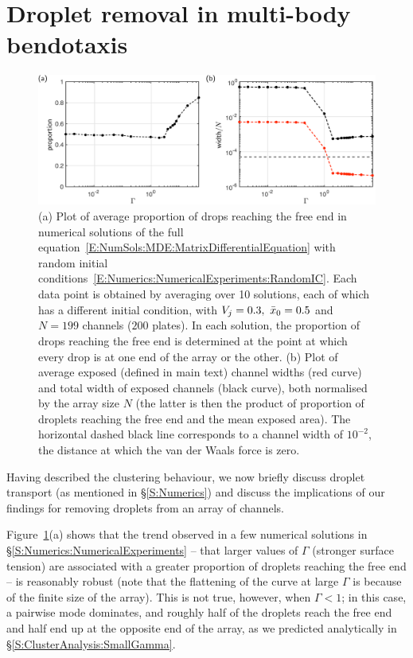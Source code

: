 \section{Droplet removal in multi-body bendotaxis}\label{S:Discussion}
\begin{figure}[t]
\centering
\includegraphics[scale=0.35]{proportion_and_exposed_area}
\caption{(a) Plot of average proportion of drops reaching the free end in numerical solutions of the full equation~\eqref{E:NumSols:MDE:MatrixDifferentialEquation} with random initial conditions~\eqref{E:Numerics:NumericalExperiments:RandomIC}. Each data point is obtained by averaging over 10 solutions, each of which has a different initial condition, with $V_j = 0.3,~ \bar{x}_0 = 0.5$ and $N = 199$ channels ($200$ plates). In each solution, the proportion of drops reaching the free end is determined at the point at which every drop is at one end of the array or the other. (b) Plot of average exposed (defined in main text) channel widths (red curve) and total width of exposed channels (black curve), both normalised by the array size $N$ (the latter is then the product of proportion of droplets reaching the free end and the mean exposed area). The horizontal dashed black line corresponds to a channel width of $10^{-2}$, the distance at which the van der Waals force is zero. }\label{fig:Discussion:Statistics}
\end{figure}

Having described the clustering behaviour, we now briefly discuss droplet transport (as mentioned in \S\ref{S:Numerics}) and discuss the implications of our findings for removing droplets from an array of channels.

Figure~\ref{fig:Discussion:Statistics}(a) shows that the trend observed in a few numerical solutions in \S\ref{S:Numerics:NumericalExperiments} -- that larger values of $\Gamma$ (stronger surface tension) are associated with a greater proportion of droplets reaching the free end -- is reasonably robust (note that the flattening of the curve at large $\Gamma$ is because of the finite size of the array). This is not true, however, when $\Gamma < 1$;  in this case,  a pairwise mode dominates, and roughly half of the droplets reach the free end and half end up at the opposite end of the array, as we predicted analytically in \S\ref{S:ClusterAnalysis:SmallGamma}.

